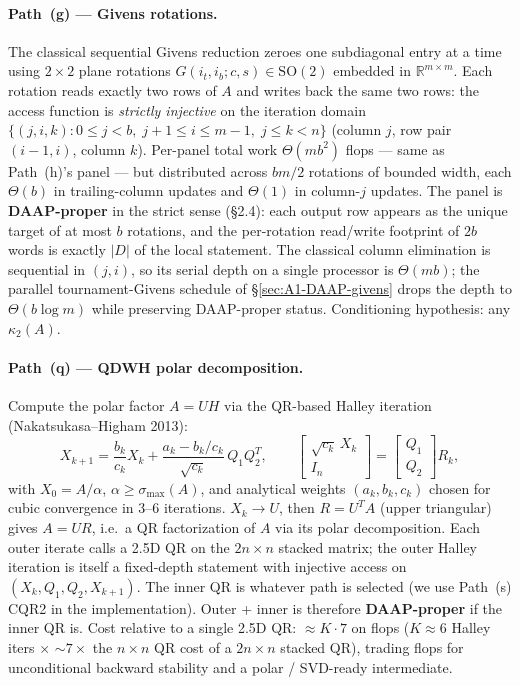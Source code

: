 \documentclass[11pt]{article}
\begin{document}
\paragraph{Path~(g) --- Givens rotations.}
The classical sequential Givens reduction zeroes one subdiagonal entry
at a time using $2\times2$ plane rotations
$G(i_t, i_b; c, s) \in \mathrm{SO}(2)$ embedded in $\mathbb{R}^{m\times m}$.
Each rotation reads exactly two rows of $A$ and writes back the same
two rows: the access function is \emph{strictly injective} on the
iteration domain $\{(j, i, k) : 0 \le j < b,\; j+1 \le i \le m-1,
\; j \le k < n\}$ (column $j$, row pair $(i{-}1, i)$, column $k$).
Per-panel total work $\Theta(m b^2)$ flops --- same as Path~(h)'s
panel --- but distributed across $b m / 2$ rotations of bounded
width, each $\Theta(b)$ in trailing-column updates and $\Theta(1)$ in
column-$j$ updates. The panel is \textbf{DAAP-proper} in the strict
sense (\S2.4): each output row appears as the unique target of at
most $b$ rotations, and the per-rotation read/write footprint of $2b$
words is exactly $|D|$ of the local statement.  The classical column
elimination is sequential in $(j, i)$, so its serial depth on a single
processor is $\Theta(m b)$; the parallel tournament-Givens schedule
of \S\ref{sec:A1-DAAP-givens} drops the depth to $\Theta(b \log m)$
while preserving DAAP-proper status. Conditioning hypothesis: any
$\kappa_2(A)$.

\paragraph{Path~(q) --- QDWH polar decomposition.}
Compute the polar factor $A = U H$ via the QR-based Halley iteration
(Nakatsukasa--Higham 2013):
\begin{equation}
X_{k+1} = \frac{b_k}{c_k} X_k + \frac{a_k - b_k/c_k}{\sqrt{c_k}} \, Q_1 Q_2^T,
\qquad
\begin{bmatrix} \sqrt{c_k}\, X_k \\ I_n \end{bmatrix}
=
\begin{bmatrix} Q_1 \\ Q_2 \end{bmatrix} R_k,
\label{eq:qdwh}
\end{equation}
with $X_0 = A/\alpha$, $\alpha \ge \sigma_{\max}(A)$, and analytical
weights $(a_k, b_k, c_k)$ chosen for cubic convergence in 3--6
iterations.  $X_k \to U$, then $R = U^T A$ (upper triangular) gives
$A = U R$, i.e.\ a QR factorization of $A$ via its polar
decomposition. Each outer iterate calls a 2.5D QR on the
$2n \times n$ stacked matrix; the outer Halley iteration is itself a
fixed-depth statement with injective access on
$(X_k, Q_1, Q_2, X_{k+1})$. The inner QR is whatever path is
selected (we use Path~(s) CQR2 in the implementation). Outer +
inner is therefore \textbf{DAAP-proper} if the inner QR is. Cost
relative to a single 2.5D QR: $\approx K \cdot 7$ on flops
($K \approx 6$ Halley iters $\times$ $\sim 7\times$ the $n\times n$
QR cost of a $2n\times n$ stacked QR), trading flops for
unconditional backward stability and a polar / SVD-ready intermediate.
\end{document}
